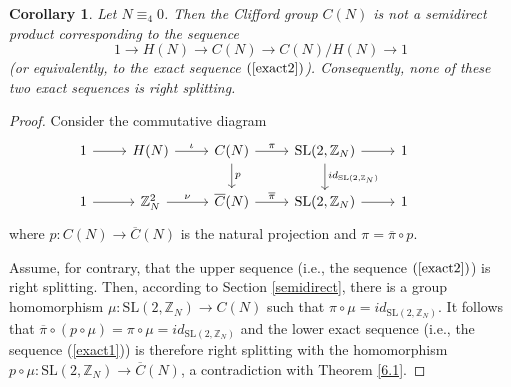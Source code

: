 \documentclass[10pt]{amsart}
\theoremstyle{plain}
\newtheorem{corollary}[theorem]{Corollary}
\theoremstyle{definition}
\theoremstyle{remark}%
\newcommand{\Z}{\mathbb{Z}}
\newcommand{\SL}{\mathrm{SL}}
\begin{document}
\begin{corollary}\label{6.2}
  Let $N\equiv_4 0$. Then the  Clifford group $C(N)$ is not a semidirect product corresponding to the sequence
 $$1 \to H(N)\to C(N)\to C(N)/H(N)\to 1
 $$   (or equivalently, to the exact sequence $(\ref{exact2})$). Consequently, none of these two exact sequences is right splitting.  
\end{corollary}
\begin{proof}
 Consider the commutative diagram
 \begin{equation*} 
\begin{tikzcd}\label{diagram_2}
1 \arrow{r}{}& H(N) \arrow{r}{\iota} & C(N) \arrow{d}{p} \arrow{r}{\pi}  & \SL(2,\Z_{N}) \arrow{d}{id_{\SL(2,\Z_N)}} \arrow{r}{} & 1\\
1 \arrow{r}{} & \Z_N^2 \arrow{r}{\nu} &\overline{C}(N) \arrow{r}{\overline{\pi}}  & \SL(2,\Z_{N}) \arrow{r}{} & 1  & 
\end{tikzcd}
\end{equation*}
where $p:C(N)\to\overline{C}(N)$ is the natural projection and $\pi=\overline{\pi}\circ p$.

Assume, for contrary, that the upper sequence (i.e., the sequence $(\ref{exact2})$)
is right splitting. Then, according to Section \ref{semidirect}, there is a group homomorphism $\mu:\SL(2,\Z_{N})\to C(N)$ such that $\pi\circ\mu=id_{\SL(2,\Z_N)}$.
 It follows that $\overline{\pi}\circ (p\circ \mu)=\pi\circ\mu=id_{\SL(2,\Z_N)}$ and the lower exact sequence (i.e., the sequence (\ref{exact1})) is therefore right splitting with the homomorphism $p\circ\mu:\SL(2,\Z_{N})\to \overline{C}(N)$, a contradiction with Theorem \ref{6.1}.
\end{proof}
\end{document}
